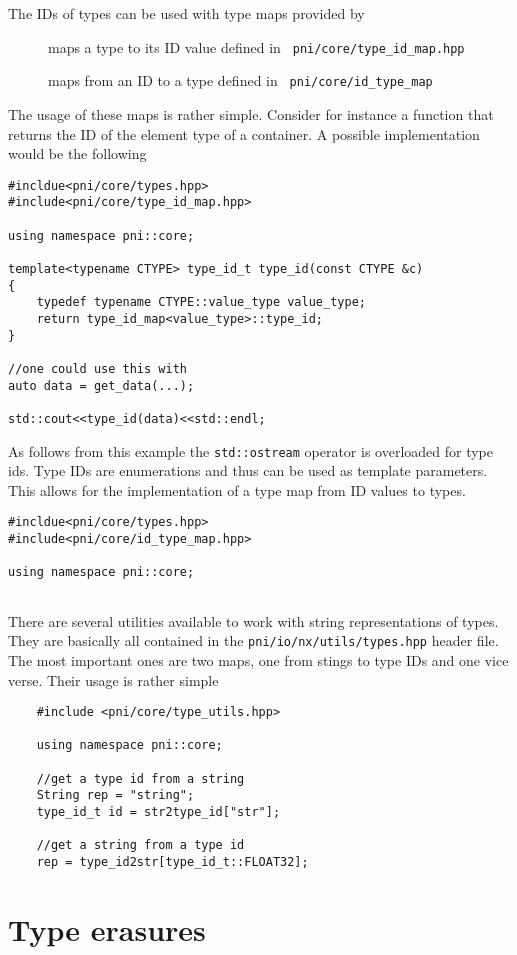 The IDs of types can be used with type maps provided by \libpnicore
\begin{description}
\item[\typeidmap] maps a type to its ID value defined in {\tt
pni/core/type\_id\_map.hpp}
\item[\idtypemap] maps from an ID to a type defined in {\tt
pni/core/id\_type\_map}
\end{description}
The usage of these maps is rather simple. Consider for instance a function that
returns the ID of the element type of a container. A possible implementation
would be the following
\begin{verbatim}
#incldue<pni/core/types.hpp>
#include<pni/core/type_id_map.hpp>

using namespace pni::core;

template<typename CTYPE> type_id_t type_id(const CTYPE &c)
{
    typedef typename CTYPE::value_type value_type;
    return type_id_map<value_type>::type_id;
}

//one could use this with 
auto data = get_data(...);

std::cout<<type_id(data)<<std::endl;
\end{verbatim}
As follows from this example the {\tt std::ostream} operator is overloaded for
type ids. Type IDs are enumerations and thus can be used as template parameters. 
This allows for the implementation of a type map from ID values to types. 
\begin{verbatim}
#incldue<pni/core/types.hpp>
#include<pni/core/id_type_map.hpp>

using namespace pni::core;


\end{verbatim}

There are several utilities available to work with string representations of
types. They are basically all contained in the {\tt pni/io/nx/utils/types.hpp}
header file. The most important ones are two maps, one from stings to type IDs
and one vice verse. Their usage is rather simple
\begin{verbatim}
    #include <pni/core/type_utils.hpp>

    using namespace pni::core;

    //get a type id from a string
    String rep = "string";
    type_id_t id = str2type_id["str"];

    //get a string from a type id
    rep = type_id2str[type_id_t::FLOAT32];
\end{verbatim}


\section{Type erasures}

